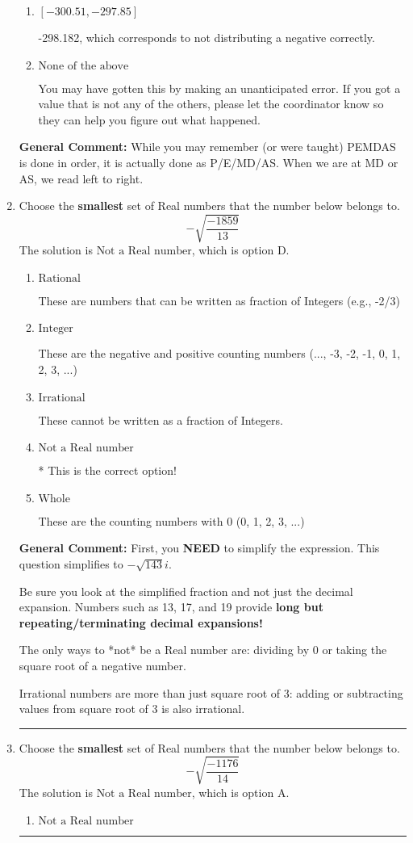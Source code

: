\documentclass{extbook}[14pt]
\newcommand{\litem}[1]{\item #1

\rule{\textwidth}{0.4pt}}
\begin{document}
\begin{enumerate}
{\begin{enumerate}[label=\Alph*.]
 343.788, which corresponds to not distributing addition and subtraction correctly.
\item \( [-300.51, -297.85] \)

 -298.182, which corresponds to not distributing a negative correctly.
\item \( \text{None of the above} \)

 You may have gotten this by making an unanticipated error. If you got a value that is not any of the others, please let the coordinator know so they can help you figure out what happened.
\end{enumerate}

\textbf{General Comment:} While you may remember (or were taught) PEMDAS is done in order, it is actually done as P/E/MD/AS. When we are at MD or AS, we read left to right.
}
\litem{
Choose the \textbf{smallest} set of Real numbers that the number below belongs to.
\[ -\sqrt{\frac{-1859}{13}} \]The solution is \( \text{Not a Real number} \), which is option D.\begin{enumerate}[label=\Alph*.]
\item \( \text{Rational} \)

These are numbers that can be written as fraction of Integers (e.g., -2/3)
\item \( \text{Integer} \)

These are the negative and positive counting numbers (..., -3, -2, -1, 0, 1, 2, 3, ...)
\item \( \text{Irrational} \)

These cannot be written as a fraction of Integers.
\item \( \text{Not a Real number} \)

* This is the correct option!
\item \( \text{Whole} \)

These are the counting numbers with 0 (0, 1, 2, 3, ...)
\end{enumerate}

\textbf{General Comment:} First, you \textbf{NEED} to simplify the expression. This question simplifies to $-\sqrt{143} i$. 
 
 Be sure you look at the simplified fraction and not just the decimal expansion. Numbers such as 13, 17, and 19 provide \textbf{long but repeating/terminating decimal expansions!} 
 
 The only ways to *not* be a Real number are: dividing by 0 or taking the square root of a negative number. 
 
 Irrational numbers are more than just square root of 3: adding or subtracting values from square root of 3 is also irrational.
}
\litem{
Choose the \textbf{smallest} set of Real numbers that the number below belongs to.
\[ -\sqrt{\frac{-1176}{14}} \]The solution is \( \text{Not a Real number} \), which is option A.\begin{enumerate}[label=\Alph*.]
\item \( \text{Not a Real number} \)


\end{enumerate}}
\end{enumerate}
\end{document}
